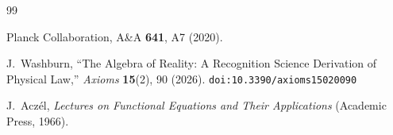 \documentclass[12pt,a4paper]{article}
\theoremstyle{definition}
\theoremstyle{remark}
\begin{document}
\begin{thebibliography}{99}

Planck Collaboration, A\&A \textbf{641}, A7 (2020).

J.~Washburn, ``The Algebra of Reality: A Recognition Science Derivation
of Physical Law,'' \emph{Axioms} \textbf{15}(2), 90 (2026).
\texttt{doi:10.3390/axioms15020090}

J.~Acz\'el, \emph{Lectures on Functional Equations and Their
Applications} (Academic Press, 1966).

\end{thebibliography}
\end{document}
